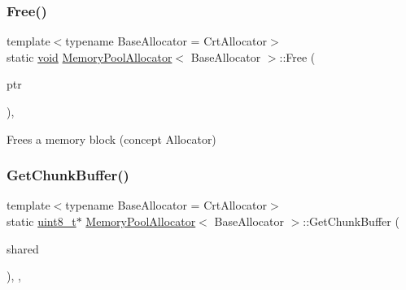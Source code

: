 \subsubsection{\texorpdfstring{Free()}{Free()}}
{\footnotesize\ttfamily template$<$typename Base\+Allocator = Crt\+Allocator$>$ \\
static \hyperlink{imgui__impl__opengl3__loader_8h_ac668e7cffd9e2e9cfee428b9b2f34fa7}{void} \hyperlink{classMemoryPoolAllocator}{Memory\+Pool\+Allocator}$<$ Base\+Allocator $>$\+::Free (\begin{DoxyParamCaption}\item[{\hyperlink{imgui__impl__opengl3__loader_8h_ac668e7cffd9e2e9cfee428b9b2f34fa7}{void} $\ast$}]{ptr }\end{DoxyParamCaption})\hspace{0.3cm}{\ttfamily [inline]}, {\ttfamily [static]}}



Frees a memory block (concept Allocator) 

\mbox{\label{classMemoryPoolAllocator_a0d325a2c92c347a9e56970e600a388f5}} 
\subsubsection{\texorpdfstring{Get\+Chunk\+Buffer()}{GetChunkBuffer()}}
{\footnotesize\ttfamily template$<$typename Base\+Allocator = Crt\+Allocator$>$ \\
static \hyperlink{stdint_8h_aba7bc1797add20fe3efdf37ced1182c5}{uint8\+\_\+t}$\ast$ \hyperlink{classMemoryPoolAllocator}{Memory\+Pool\+Allocator}$<$ Base\+Allocator $>$\+::Get\+Chunk\+Buffer (\begin{DoxyParamCaption}\item[{\hyperlink{structMemoryPoolAllocator_1_1SharedData}{Shared\+Data} $\ast$}]{shared }\end{DoxyParamCaption})\hspace{0.3cm}{\ttfamily [inline]}, {\ttfamily [static]}, {\ttfamily [private]}}

\mbox{\label{classMemoryPoolAllocator_a2740669a8b5ba8f781bd11c7c3fd988a}} 
